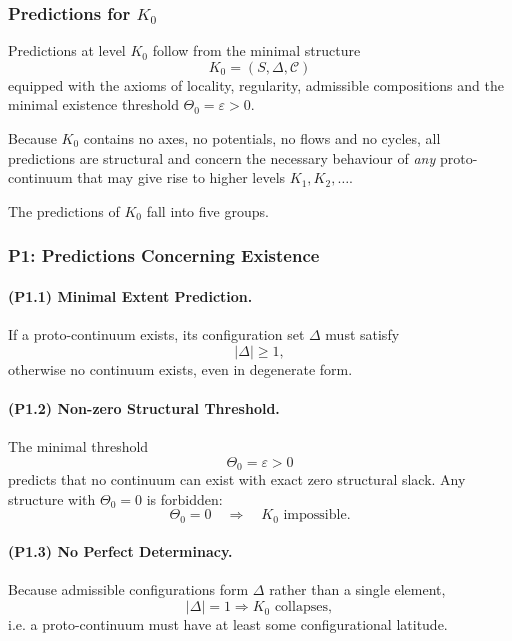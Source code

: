 

\subsubsection{Predictions for \texorpdfstring{$K_0$}{K_0}}
\label{sec:predictions-k0}

Predictions at level $K_0$ follow from the minimal structure
\[
K_0 = (S, \Delta, \mathcal{C})
\]
equipped with the axioms of locality, regularity, admissible compositions
and the minimal existence threshold $\Theta_0 = \varepsilon > 0$.

Because $K_0$ contains no axes, no potentials, no flows and no cycles,
all predictions are structural and concern the necessary behaviour of
\emph{any} proto-continuum that may give rise to higher levels $K_1, K_2,\dots$.

The predictions of $K_0$ fall into five groups.

\subsubsection{P1: Predictions Concerning Existence}

\paragraph{(P1.1) Minimal Extent Prediction.}
If a proto-continuum exists, its configuration set $\Delta$ must satisfy
\[
|\Delta| \ge 1,
\]
otherwise no continuum exists, even in degenerate form.

\paragraph{(P1.2) Non-zero Structural Threshold.}
The minimal threshold
\[
\Theta_0 = \varepsilon > 0
\]
predicts that no continuum can exist with exact zero structural slack.
Any structure with $\Theta_0 = 0$ is forbidden:
\[
\Theta_0 = 0 \quad\Rightarrow\quad K_0 \text{ impossible}.
\]

\paragraph{(P1.3) No Perfect Determinacy.}
Because admissible configurations form $\Delta$ rather than a single element,
\[
|\Delta| = 1 \Rightarrow K_0 \text{ collapses},
\]
i.e. a proto-continuum must have at least some configurational latitude.

